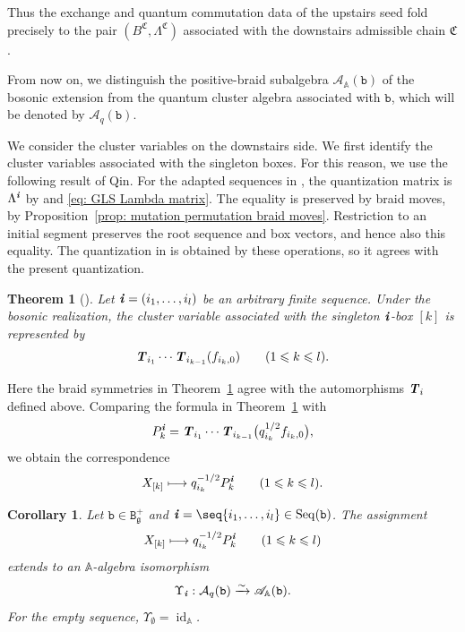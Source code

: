 \documentclass[12pt, leqno]{amsart}
\numberwithin{equation}{section}
\theoremstyle{plain}
\newtheorem{theorem}[lemma]{Theorem}
\newtheorem{corollary}[lemma]{Corollary}
\theoremstyle{definition}
\renewcommand{\le}{\leqslant}
\newcommand{\g}{\mathfrak{g}}
\newcommand{\ii}{ \textbf{\textit{i}}}
\newcommand{\frakC}{\mathfrak{C}}
\newcommand{\bbA}{\mathbb{A}}
\newcommand{\calA}{\mathcal{A}}
\newcommand{\scrA}{\mathscr{A}}
\newcommand{\ttB}{\mathtt{B}}
\newcommand{\ttb}{\mathtt{b}}
\newcommand{\TT}{ \textbf{\textit{T}}}
\newcommand{\Seq}{\mathrm{Seq}}
\begin{document}
Thus the exchange and quantum commutation data of the upstairs seed
fold precisely to the pair
$(B^{\frakC},\Lambda^{\frakC})$
associated with the downstairs admissible chain $\frakC$.

From now on, we distinguish the positive-braid subalgebra
$\scrA_{\bbA}(\ttb)$ of the bosonic extension from the quantum
cluster algebra associated with $\ttb$, which will be denoted by
$\calA_q(\ttb)$.

We consider the cluster variables on the downstairs side.
We first identify the cluster variables associated with the singleton boxes.
For this reason, we use the following result of Qin.
For the adapted sequences in \cite[Section~5.1]{Qin24B},
the quantization matrix is $\Lambda^\ii$ by
\cite[(7.1) and~(7.5)]{KO23} and \eqref{eq: GLS Lambda matrix}.
The equality is preserved by braid moves, by
Proposition~\ref{prop: mutation permutation braid moves}.
Restriction to an initial segment preserves the root sequence
and box vectors, and hence also this equality.
The quantization in \cite[Section~6.3]{Qin24B} is obtained by
these operations, so it agrees with the present quantization.


\begin{theorem}[{\cite[Theorem~6.6]{Qin24B}}]
\label{thm: Qin fundamental variables}
Let $\ii=(i_1,\ldots,i_l)$ be an arbitrary finite sequence.  Under the bosonic realization,
the cluster variable associated with the singleton $\ii$-box $[k]$ is represented by
\[
\TT_{i_1}\cdots \TT_{i_{k-1}}(f_{i_k,0}) \qquad (1\le k\le l).
\]
\end{theorem}

 
Here the braid symmetries in
Theorem~\ref{thm: Qin fundamental variables} agree with
the automorphisms $\TT_i$ defined above. 
 Comparing the formula in Theorem~\ref{thm: Qin fundamental variables} with{}
\[
P_k^\ii = \TT_{i_1}\cdots\TT_{i_{k-1}} \bigl(q_{i_k}^{1/2}f_{i_k,0}\bigr),
\]
we obtain
the correspondence
\[
X_{[k]}\longmapsto q_{i_k}^{-1/2}P_k^\ii
\qquad(1\le k\le l).
\]



\begin{corollary}
\label{cor: positive braid cluster algebra}
Let $\ttb\in\ttB_\g^+$ and
$\ii=\seq{i_1,\ldots,i_l}\in\Seq(\ttb)$.
The assignment
\[
X_{[k]}\longmapsto q_{i_k}^{-1/2}P_k^\ii
\qquad(1\le k\le l)
\]
extends to an $\bbA$-algebra isomorphism
\[
\Upsilon_\ii:\calA_q(\ttb)\xrightarrow{\sim}\scrA_\bbA(\ttb).
\]
For the empty sequence, $\Upsilon_\emptyset=\operatorname{id}_{\bbA}$.
\end{corollary}
 
\end{document}
